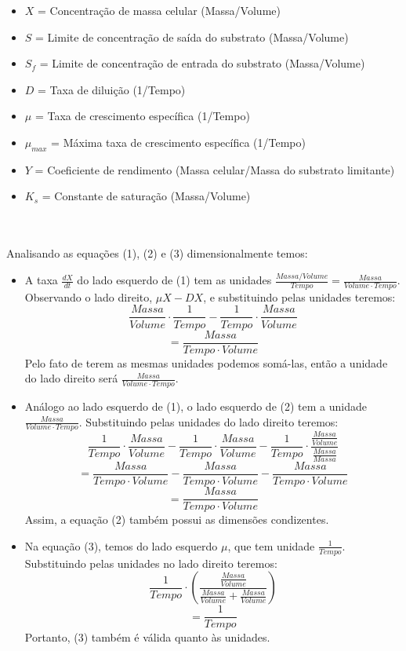 \documentclass{article}
\begin{document}
\begin{itemize}
\item $X$ = Concentração de massa celular (Massa/Volume)
\item $S$ = Limite de concentração de saída do substrato (Massa/Volume)
\item $S_f$ = Limite de concentração de entrada do substrato (Massa/Volume)
\item $D$ = Taxa de diluição (1/Tempo)
\item $\mu$ = Taxa de crescimento específica (1/Tempo)
\item $\mu_{max}$ = Máxima taxa de crescimento específica (1/Tempo)
\item $Y$ = Coeficiente de rendimento (Massa celular/Massa do substrato limitante)
\item $K_s$ = Constante de saturação (Massa/Volume)
\end{itemize}
\\\\Analisando as equações (1), (2) e (3) dimensionalmente temos:
\begin{itemize}
    \item A taxa $\frac{dX}{dt}$ do lado esquerdo de (1) tem as unidades $\frac{Massa/Volume}{Tempo} = \frac{Massa}{Volume \cdot Tempo}$. Observando o lado direito, $\mu X - DX$, e substituindo pelas unidades teremos: 
    $$\frac{Massa}{Volume} \cdot \frac{1}{Tempo} - \frac{1}{Tempo} \cdot \frac{Massa}{Volume}$$
    $$= \frac{Massa}{Tempo \cdot Volume}$$
    Pelo fato de terem as mesmas unidades podemos somá-las, então a unidade do lado direito será $\frac{Massa}{Volume \cdot Tempo}$.
    \item Análogo ao lado esquerdo de (1), o lado esquerdo de (2) tem a unidade $\frac{Massa}{Volume \cdot Tempo}$. Substituindo pelas unidades do lado direito teremos:
    $$\frac{1}{Tempo} \cdot \frac{Massa}{Volume} - \frac{1}{Tempo} \cdot \frac{Massa}{Volume} - \frac{1}{Tempo} \cdot \frac{\frac{Massa}{Volume}}{\frac{Massa}{Massa}} $$
    $$= \frac{Massa}{Tempo \cdot Volume} - \frac{Massa}{Tempo \cdot Volume} - \frac{Massa}{Tempo \cdot Volume}$$
    $$= \frac{Massa}{Tempo \cdot Volume} $$
    Assim, a equação (2) também possui as dimensões condizentes.
    \item Na equação (3), temos do lado esquerdo $\mu$, que tem unidade $\frac{1}{Tempo}$. Substituindo pelas unidades no lado direito teremos:
    $$\frac{1}{Tempo} \cdot \left(\frac{\frac{Massa}{Volume}}{\frac{Massa}{Volume} + \frac{Massa}{Volume}}\right)$$
    $$= \frac{1}{Tempo}$$
    Portanto, (3) também é válida quanto às unidades.
    
\end{itemize}
\end{document}
